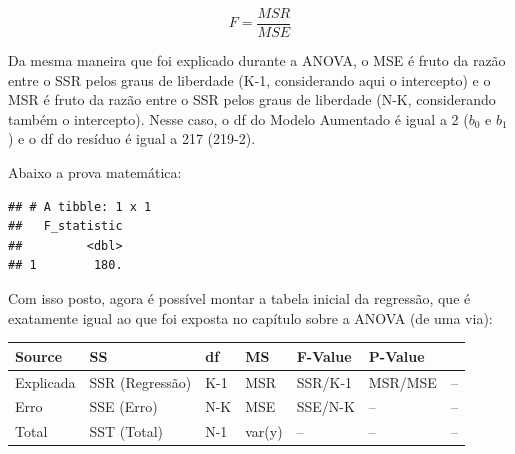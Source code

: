 \documentclass[
]{book}
\newenvironment{Shaded}{\begin{snugshade}}{\end{snugshade}}
\newcommand{\DataTypeTok}[1]{\textcolor[rgb]{0.13,0.29,0.53}{#1}}
\newcommand{\DecValTok}[1]{\textcolor[rgb]{0.00,0.00,0.81}{#1}}
\newcommand{\KeywordTok}[1]{\textcolor[rgb]{0.13,0.29,0.53}{\textbf{#1}}}
\newcommand{\NormalTok}[1]{#1}
\newcommand{\OperatorTok}[1]{\textcolor[rgb]{0.81,0.36,0.00}{\textbf{#1}}}
\newcommand{\StringTok}[1]{\textcolor[rgb]{0.31,0.60,0.02}{#1}}
\begin{document}
\[ F = \frac{MSR}{MSE}\]

Da mesma maneira que foi explicado durante a ANOVA, o MSE é fruto da razão entre o SSR pelos graus de liberdade (K-1, considerando aqui o intercepto) e o MSR é fruto da razão entre o SSR pelos graus de liberdade (N-K, considerando também o intercepto). Nesse caso, o df do Modelo Aumentado é igual a 2 (\(b_0\) e \(b_1\)) e o df do resíduo é igual a 217 (219-2).

Abaixo a prova matemática:

\begin{Shaded}
\end{Shaded}

\begin{verbatim}
## # A tibble: 1 x 1
##   F_statistic
##         <dbl>
## 1        180.
\end{verbatim}

Com isso posto, agora é possível montar a tabela inicial da regressão, que é exatamente igual ao que foi exposta no capítulo sobre a ANOVA (de uma via):

\begin{longtable}[]{@{}lllllll@{}}
\toprule
Source & SS & df & MS & F-Value & P-Value &\tabularnewline
\midrule
\endhead
Explicada & SSR (Regressão) & K-1 & MSR & SSR/K-1 & MSR/MSE & --\tabularnewline
Erro & SSE (Erro) & N-K & MSE & SSE/N-K & -- & --\tabularnewline
Total & SST (Total) & N-1 & var(y) & -- & -- & --\tabularnewline
\bottomrule
\end{longtable}
\end{document}
